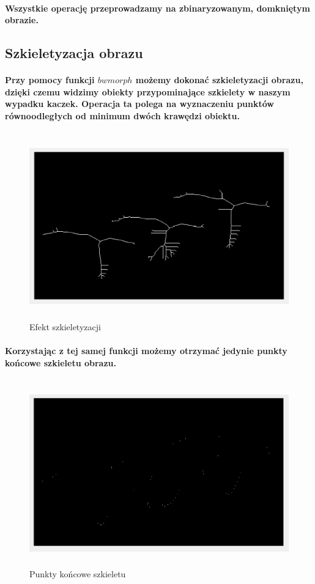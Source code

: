 \documentclass[a4paper,12pt]{article}
\begin{document}
\begin{justify}
\paragraph{Wszystkie operację przeprowadzamy na zbinaryzowanym, domkniętym obrazie.}

\subsection{Szkieletyzacja obrazu}

\paragraph{Przy pomocy funkcji $bwmorph$ możemy dokonać szkieletyzacji obrazu, dzięki czemu widzimy obiekty przypominające szkielety w naszym wypadku kaczek. Operacja ta polega na wyznaczeniu punktów równoodległych od minimum dwóch krawędzi obiektu. }

\begin{figure}[h]
\centering
\includegraphics[width=12cm, height=8cm]{2_1}
\caption{Efekt szkieletyzacji}
\end{figure}

\paragraph{Korzystając z tej samej funkcji możemy otrzymać jedynie punkty końcowe szkieletu obrazu.}

\begin{figure}[h]
\centering
\includegraphics[width=12cm, height=8cm]{2_2}
\caption{Punkty końcowe szkieletu}
\end{figure}


\end{justify}
\end{document}
